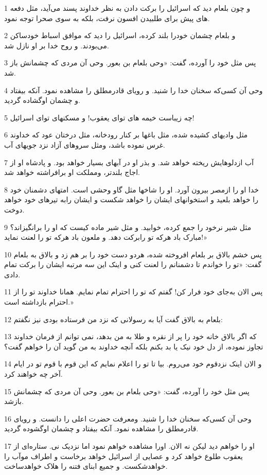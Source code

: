 \par 1 و چون بلعام دید که اسرائیل را برکت دادن به نظر خداوند پسند می‌آید، مثل دفعه های پیش برای طلبیدن افسون نرفت، بلکه به سوی صحرا توجه نمود.
\par 2 و بلعام چشمان خودرا بلند کرده، اسرائیل را دید که موافق اسباط خودساکن می‌بودند. و روح خدا بر او نازل شد.
\par 3 پس مثل خود را آورده، گفت: «وحی بلعام بن بعور. وحی آن مردی که چشمانش باز شد.
\par 4 وحی آن کسی‌که سخنان خدا را شنید. و رویای قادرمطلق را مشاهده نمود. آنکه بیفتاد و چشمان اوگشاده گردید.
\par 5 چه زیباست خیمه های تو‌ای یعقوب! و مسکنهای تو‌ای اسرائیل!
\par 6 مثل وادیهای کشیده شده، مثل باغها بر کنار رودخانه، مثل درختان عود که خداوند غرس نموده باشد، ومثل سروهای آزاد نزد جویهای آب.
\par 7 آب ازدلوهایش ریخته خواهد شد. و بذر او در آبهای بسیار خواهد بود. و پادشاه او از اجاج بلندتر، ومملکت او برافراشته خواهد شد.
\par 8 خدا او را ازمصر بیرون آورد. او را شاخها مثل گاو وحشی است. امتهای دشمنان خود را خواهد بلعید و استخوانهای ایشان را خواهد شکست و ایشان رابه تیرهای خود خواهد دوخت.
\par 9 مثل شیر نرخود را جمع کرده، خوابید. و مثل شیر ماده کیست که او را برانگیزاند؟ مبارک باد هر‌که تو رابرکت دهد. و ملعون باد هر‌که تو را لعنت نماید!»
\par 10 پس خشم بالاق بر بلعام افروخته شده، هردو دست خود را بر هم زد و بالاق به بلعام گفت: «تو را خواندم تا دشمنانم را لعنت کنی و اینک این سه مرتبه ایشان را برکت تمام دادی.
\par 11 پس الان به‌جای خود فرار کن! گفتم که تو را احترام تمام نمایم. همانا خداوند تو را از احترام بازداشته است.»
\par 12 بلعام به بالاق گفت آیا به رسولانی که نزد من فرستاده بودی نیز نگفتم:
\par 13 که اگر بالاق خانه خود را پر از نقره و طلا به من بدهد، نمی توانم از فرمان خداوند تجاوز نموده، از دل خود نیک یا بد بکنم بلکه آنچه خداوند به من گوید آن را خواهم گفت؟
\par 14 و الان اینک نزدقوم خود می‌روم. بیا تا تو را اعلام نمایم که این قوم با قوم تو در ایام آخر چه خواهند کرد.
\par 15 پس مثل خود را آورده، گفت: «وحی بلعام بن بعور. وحی آن مردی که چشمانش بازشد.
\par 16 وحی آن کسی‌که سخنان خدا را شنید. ومعرفت حضرت اعلی را دانست. و رویای قادرمطلق را مشاهده نمود. آنکه بیفتاد و چشمان اوگشوده گردید.
\par 17 او را خواهم دید لیکن نه الان. اورا مشاهده خواهم نمود اما نزدیک نی. ستاره‌ای از یعقوب طلوع خواهد کرد و عصایی از اسرائیل خواهد برخاست و اطراف موآب را خواهدشکست. و جمیع ابنای فتنه را هلاک خواهدساخت.
